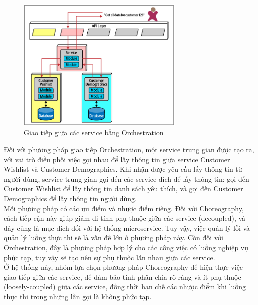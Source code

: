\begin{figure}[!htp]
	\centering
	\includegraphics[width=8cm]{img/Architecture/orchestration.PNG}
	\newline
	\caption{Giao tiếp giữa các service bằng Orchestration \cite{archOrchestration}}
\end{figure}
Đối với phương pháp giao tiếp Orchestration, một service trung gian được tạo ra, với vai trò điều phối việc gọi nhau để lấy thông tin giữa service Customer Wishlist và Customer Demographics. Khi nhận được yêu cầu lấy thông tin từ người dùng, service trung gian gọi đến các service đích để lấy thông tin: gọi đến Customer Wishlist để lấy thông tin danh sách yêu thích, và gọi đến Customer Demographics để lấy thông tin người dùng.\\

Mỗi phương pháp có các ưu điểm và nhược điểm riêng. Đối với Choreography, cách tiếp cận này giúp giảm đi tính phụ thuộc giữa các service (decoupled), và đây cũng là mục đích đối với hệ thống microservice. Tuy vậy, việc quản lý lỗi và quản lý luồng thực thi sẽ là vấn đề lớn ở phương pháp này. Còn đối với Orchestration, đây là phương pháp hợp lý cho các công việc có luồng nghiệp vụ phức tạp, tuy vậy sẽ tạo nên sự phụ thuộc lẫn nhau giữa các service.\\

Ở hệ thống này, nhóm lựa chọn phương pháp Choreography để hiện thực việc giao tiếp giữa các service, để đảm bảo tính phân chia rõ ràng và ít phụ thuộc (loosely-coupled) giữa các service, đồng thời hạn chế các nhược điểm khi luồng thực thi trong những lần gọi là không phức tạp.

